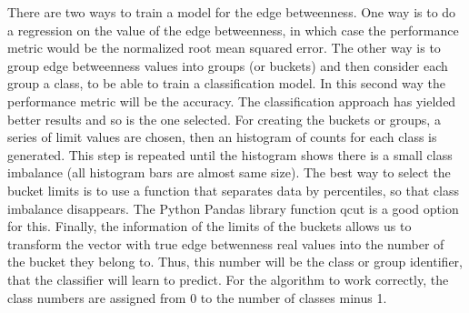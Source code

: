 

There are two ways to train a model for the edge betweenness. One way is to do a regression on the value of the edge betweenness, in which case the performance metric would be the normalized root mean squared error. The other way is to group edge betweenness values into groups (or buckets) and then consider each group a class, to be able to train a classification model. In this second way the performance metric will be the accuracy. The classification approach has yielded better results and so is the one selected. For creating the buckets or groups, a series of limit values are chosen, then an histogram of counts for each class is generated. This step is repeated until the histogram shows there is a small class imbalance (all histogram bars are almost same size). The best way to select the bucket limits is to use a function that separates data by percentiles, so that class imbalance disappears. The Python Pandas library function qcut is a good option for this. Finally, the information of the limits of the buckets allows us to transform the vector with true edge betwenness real values into the number of the bucket they belong to. Thus, this number will be the class or group identifier, that the classifier will learn to predict. For the algorithm to work correctly, the class numbers are assigned from 0 to the number of classes minus 1.





